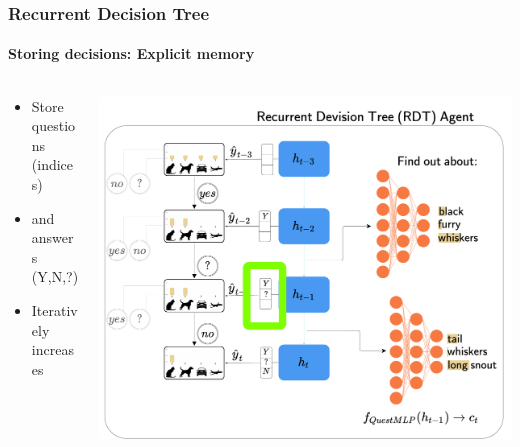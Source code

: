 \documentclass[9pt]{beamer}
\begin{document}
\begin{frame}
\frametitle{Recurrent Decision Tree}
\framesubtitle{Storing decisions: Explicit memory}
\begin{columns}[T]
	\begin{column}{.5\textwidth}
		\begin{itemize}
			\item Store questions (indices)
			\item and answers (Y,N,?)
			\item Iteratively increases
		\end{itemize}
	\end{column}
	\begin{column}{.5\textwidth}
		\includegraphics[width=\textwidth]{images/urdtc_parts_memory.pdf}
	\end{column}
\end{columns}
\end{frame}
\end{document}
